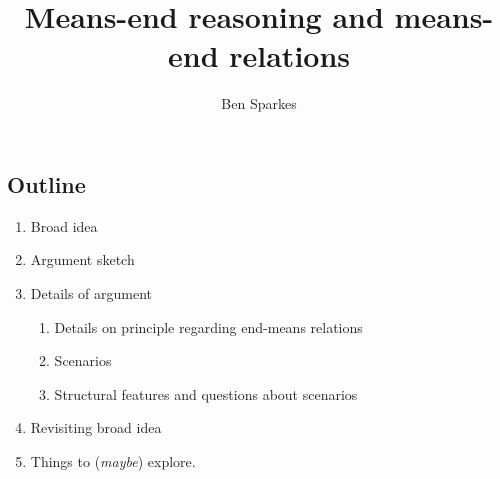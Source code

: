 \documentclass[10pt]{article}
\title{Means-end reasoning and means-end relations}
\author{Ben Sparkes}
\newcommand{\hozline}[0]{%
  \noindent\hdashrule[0.5ex][c]{\textwidth}{.1pt}{}
}
\begin{document}
\maketitle

\subsection*{Outline}
\label{sec:outline}

\begin{enumerate}
\item Broad idea
\item Argument sketch
\item Details of argument
  \begin{enumerate}
  \item Details on principle regarding end-means relations
  \item Scenarios
  \item Structural features and questions about scenarios
  \end{enumerate}
\item Revisiting broad idea
\item Things to (\emph{maybe}) explore.
\end{enumerate}






\hozline
\end{document}
